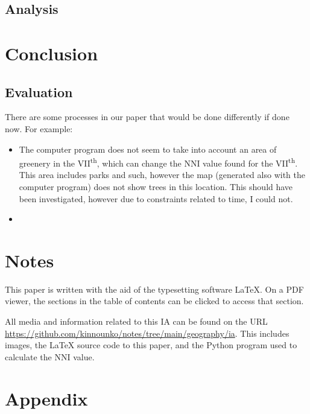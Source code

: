 \documentclass[11pt,letterpaper]{article}
\begin{document}
\subsection{Analysis}

\section{Conclusion}
\label{sec:conclusion}

\subsection{Evaluation}

There are some processes in our paper that would be done differently if done now. For example:

\begin{itemize}

    \item The computer program does not seem to take into account an area of greenery in the VII\textsuperscript{th}, which can change the NNI value found for the VII\textsuperscript{th}. This area includes parks and such, however the map (generated also with the computer program) does not show trees in this location. This should have been investigated, however due to constraints related to time, I could not.
    \item

\end{itemize}

\newpage
{}


\section*{Notes}
\label{sec:notes}

This paper is written with the aid of the typesetting software \LaTeX. On a PDF viewer, the sections in the table of contents can be clicked to access that section.

All media and information related to this IA can be found on the URL \url{https://github.com/kinnounko/notes/tree/main/geography/ia}. This includes images, the \LaTeX{} source code to this paper, and the Python program used to calculate the NNI value.

\printbibliography

\appendix
\section{Appendix}
\label{app}
\end{document}
